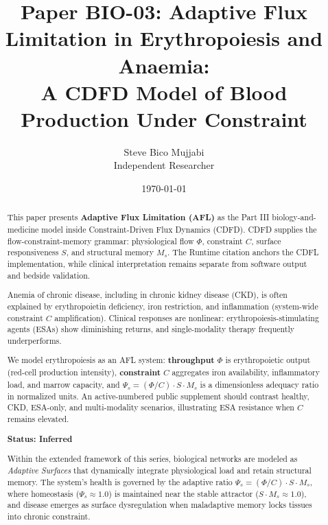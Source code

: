 \documentclass[11pt]{article}
\title{\textbf{Paper BIO-03: Adaptive Flux Limitation in Erythropoiesis and Anaemia:\\ A CDFD Model of Blood Production Under Constraint}}
\author{Steve Bico Mujjabi\\ \small Independent Researcher}
\date{\today}
\begin{document}
\maketitle

\begin{abstract}

This paper presents \textbf{Adaptive Flux Limitation (AFL)} as the Part III biology-and-medicine model inside Constraint-Driven Flux Dynamics (CDFD). CDFD supplies the flow-constraint-memory grammar: physiological flow $\Phi$, constraint $C$, surface responsiveness $S$, and structural memory $M_s$. The Runtime citation anchors the CDFL implementation, while clinical interpretation remains separate from software output and bedside validation.

Anemia of chronic disease, including in chronic kidney disease (CKD), is often explained by erythropoietin deficiency, iron restriction, and inflammation (system-wide constraint $C$ amplification). Clinical responses are nonlinear: erythropoiesis-stimulating agents (ESAs) show diminishing returns, and single-modality therapy frequently underperforms.

We model erythropoiesis as an AFL system: \textbf{throughput} $\Phi$ is erythropoietic output (red-cell production intensity), \textbf{constraint} $C$ aggregates iron availability, inflammatory load, and marrow capacity, and $\Psi_s=(\Phi/C) \cdot S \cdot M_s$ is a dimensionless adequacy ratio in normalized units. An active-numbered public supplement should contrast healthy, CKD, ESA-only, and multi-modality scenarios, illustrating ESA resistance when $C$ remains elevated.

\textbf{Status: Inferred}

\medskip
\noindent Within the extended framework of this series, biological networks are modeled as \emph{Adaptive Surfaces} that dynamically integrate physiological load and retain structural memory. The system's health is governed by the adaptive ratio $\Psi_s = (\Phi/C) \cdot S \cdot M_s$, where homeostasis ($\Psi_s \approx 1.0$) is maintained near the stable attractor ($S \cdot M_s \approx 1.0$), and disease emerges as surface dysregulation when maladaptive memory locks tissues into chronic constraint.

\end{abstract}
\end{document}
